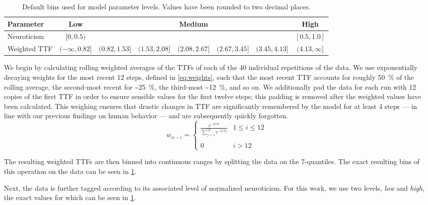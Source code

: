 \begin{table}[]
    \centering
    \caption{%
        Default bins used for model parameter levels.
        Values have been rounded to two decimal places.
    }
    \label{tab:defaultbins}
    \begin{tabular}{@{}lccccccc@{}}
        \toprule
        \textbf{Parameter} & \textbf{Low} & & & \textbf{Medium} & & & \textbf{High}         \\ \midrule
        Neuroticism        & \( [0, 0.5) \) & & & & & & \( [0.5, 1.0] \)      \\
        Weighted TTF & \((-\infty, 0.82]\) & \((0.82, 1.53]\) & \((1.53, 2.08]\) & \((2.08, 2.67]\) & \((2.67, 3.45]\) & \((3.45, 4.13]\) & \((4.13, \infty]\)
    \end{tabular}
\end{table}

We begin by calculating rolling weighted averages of the \acp{TTF} of each of the \num{40} individual repetitions of the data.
We use exponentially decaying weights for the most recent \num{12} steps, defined in \cref{eq:weights}, such that the most recent \ac{TTF} accounts for roughly \SI{50}{\percent} of the rolling average, the second-most recent for \textasciitilde\SI{25}{\percent}, the third-most \textasciitilde\SI{12}{\percent}, and so on.
We additionally pad the data for each run with \num{12} copies of the first \ac{TTF} in order to ensure sensible values for the first twelve steps; this padding is removed after the weighted values have been calculated.
This weighing ensures that drastic changes in \ac{TTF} are significantly remembered by the model for at least \num{4} steps --- in line with our previous findings on human behavior --- and are subsequently quickly forgotten.
\begin{equation}\label{eq:weights}
    w_{n - i} = 
    \left\{ \begin{array}{ll}
        \frac{e^{-0.7 i}}{\sum\limits^{12}_{j=1} e^{-0.7 j}} & 1 \leq i \leq 12 \\
        & \\
        0 & i > 12
    \end{array} \right.
\end{equation}

The resulting weighted \acp{TTF} are then binned into continuous ranges by splitting the data on the \num{7}-quantiles.
The exact resulting bins of this operation on the data can be seen in \cref{tab:defaultbins}.

Next, the data is further tagged according to its associated level of normalized neuroticism.
For this work, we use two levels, \emph{low} and \emph{high}, the exact values for which can be seen in \cref{tab:defaultbins}.

